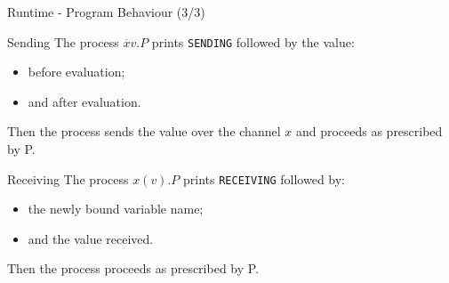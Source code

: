 \begin{frame}{Runtime - Program Behaviour (3/3)}
    \begin{block}{Sending}
        The process $\overline{x} v . P$ prints \texttt{SENDING} followed by the value: 
        \begin{itemize}
            \item before evaluation;
            \item and after evaluation.
        \end{itemize}
        
        Then the process sends the value over the channel $x$ and proceeds as prescribed by P.
    \end{block}

    \begin{block}{Receiving}
        The process $x(v) . P$ prints \texttt{RECEIVING} followed by: 
        \begin{itemize}
            \item the newly bound variable name;
            \item and the value received.
        \end{itemize}
        
        Then the process proceeds as prescribed by P.
    \end{block}
\end{frame}